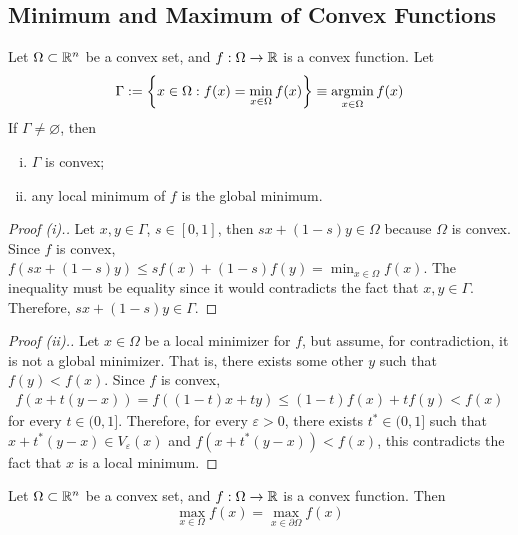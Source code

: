 \documentclass{article}
\begin{document}
    \subsection{Minimum and Maximum of Convex Functions}
    \begin{theorem}
        Let $\Omega \subset \mathbb{R}^n$ be a convex set, and $f: \Omega \to \mathbb{R}$ is a convex function. Let
        \begin{align}
        	\Gamma := \left\{x \in \Omega: f(x) = \min_{x \in \Omega} f(x) \right\} \equiv \operatorname*{argmin}_{x \in \Omega} f(x)
        \end{align}
        If $\Gamma \neq \varnothing$, then 
        \begin{enumerate}[(i)]
        	\item $\Gamma$ is convex;
        	\item any local minimum of $f$ is the global minimum.
        \end{enumerate}
    \end{theorem}
    
    \begin{proof}[Proof (i).]
    	Let $x, y \in \Gamma$, $s \in [0, 1]$, then $sx+(1-s)y \in \Omega$ because $\Omega$ is convex. Since $f$ is convex, $f(sx+(1-s)y) \leq sf(x) + (1-s)f(y) = \min_{x \in \Omega} f(x)$. The inequality must be equality since it would contradicts the fact that $x, y \in \Gamma$. Therefore, $sx+(1-s)y \in \Gamma$.
    \end{proof}
    
    \begin{proof}[Proof (ii).]
    	Let $x \in \Omega$ be a local minimizer for $f$, but assume, for contradiction, it is not a global minimizer. That is, there exists some other $y$ such that $f(y) < f(x)$. Since $f$ is convex, \begin{align}
 				f(x + t(y-x)) = f((1-t)x + ty) \leq (1-t)f(x) + tf(y) < f(x)
			\end{align}
			for every $t \in (0, 1]$. Therefore, for every $\varepsilon > 0$, there exists $t^* \in (0, 1]$ such that $x + t^*(y-x) \in V_\varepsilon(x)$ and $f(x + t^*(y-x)) < f(x)$, this contradicts the fact that $x$ is a local minimum.
    \end{proof}
    
    \begin{theorem}
        Let $\Omega \subset \mathbb{R}^n$ be a convex set, and $f: \Omega \to \mathbb{R}$ is a convex function. Then 
        \begin{equation}
            \max_{x \in \Omega} f(x) = \max_{x \in \partial \Omega} f(x)
        \end{equation}
    \end{theorem}
    
\end{document}
